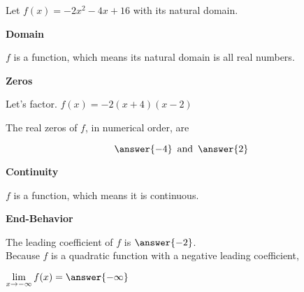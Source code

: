 \documentclass{ximera}
\author{Lee Wayand}
\begin{document}
\begin{exercise} 




Let $f(x) = -2x^2 - 4x + 16$ with its natural domain. \\




\begin{question}  \textbf{\textcolor{blue!55!black}{Domain}}


$f$ is a  function, which means its natural domain is all real numbers.

\end{question}








\begin{question}  \textbf{\textcolor{blue!55!black}{Zeros}}


Let's factor.  $f(x) = -2 (x+4)(x-2)$ 


The real zeros of $f$, in numerical order, are

\[
\answer{-4} \, \text{ and } \, \answer{2}
\]

\end{question}







\begin{question}  \textbf{\textcolor{blue!55!black}{Continuity}}


$f$ is a  function, which means it is continuous.

\end{question}









\begin{question}  \textbf{\textcolor{blue!55!black}{End-Behavior}}


The leading coefficient of $f$ is $\answer{-2}$. \\


Because $f$ is a quadratic function with a negative leading coefficient,

$\lim\limits_{x \to -\infty} f(x) = \answer{-\infty}$ \\



\end{question}
\end{exercise}
\end{document}
